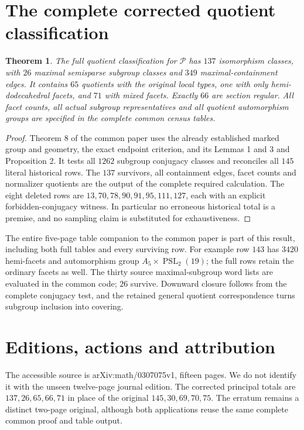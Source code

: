 \documentclass[11pt,a4paper]{article}
\newtheorem{theorem}{Theorem}\newtheorem{lemma}[theorem]{Lemma}
\newcommand{\PSL}{\operatorname{PSL}}\newcommand{\Aut}{\operatorname{Aut}}
\begin{document}
\section{The complete corrected quotient classification}
\begin{theorem}\label{census}
The full quotient classification for $\mathcal P$ has $137$ isomorphism classes, with $26$ maximal semisparse subgroup classes and $349$ maximal-containment edges. It contains $65$ quotients with the original local types, one with only hemi-dodecahedral facets, and $71$ with mixed facets. Exactly $66$ are section regular. All facet counts, all actual subgroup representatives and all quotient automorphism groups are specified in the complete common census tables.
\end{theorem}
\begin{proof}
Theorem 8 of the common paper uses the already established marked group and geometry, the exact endpoint criterion, and its Lemmas 1 and 3 and Proposition 2. It tests all $1262$ subgroup conjugacy classes and reconciles all $145$ literal historical rows. The $137$ survivors, all containment edges, facet counts and normalizer quotients are the output of the complete required calculation. The eight deleted rows are $13,70,78,90,91,95,111,127$, each with an explicit forbidden-conjugacy witness. In particular no erroneous historical total is a premise, and no sampling claim is substituted for exhaustiveness.
\end{proof}
The entire five-page table companion to the common paper is part of this result, including both full tables and every surviving row. For example row $143$ has $3420$ hemi-facets and automorphism group $A_5\times\PSL_2(19)$; the full rows retain the ordinary facets as well. The thirty source maximal-subgroup word lists are evaluated in the common code; $26$ survive. Downward closure follows from the complete conjugacy test, and the retained general quotient correspondence turns subgroup inclusion into covering.

\section{Editions, actions and attribution}
The accessible source is arXiv:math/0307075v1, fifteen pages. We do not identify it with the unseen twelve-page journal edition. The corrected principal totals are $137,26,65,66,71$ in place of the original $145,30,69,70,75$. The erratum remains a distinct two-page original, although both applications reuse the same complete common proof and table output.
\end{document}
